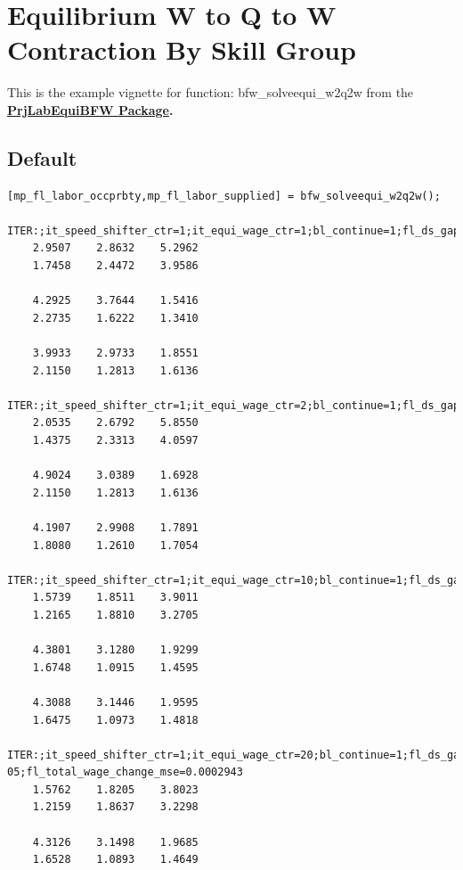 \documentclass[
]{book}
\begin{document}
\hypertarget{equilibrium-w-to-q-to-w-contraction-by-skill-group}{%
\section{Equilibrium W to Q to W Contraction By Skill Group}\label{equilibrium-w-to-q-to-w-contraction-by-skill-group}}

This is the example vignette for function: bfw\_solveequi\_w2q2w from the
\href{https://fanwangecon.github.io/PrjLabEquiBFW/}{\textbf{PrjLabEquiBFW
Package}}\textbf{.}

\hypertarget{default-2}{%
\subsection{Default}\label{default-2}}

\begin{verbatim}
[mp_fl_labor_occprbty,mp_fl_labor_supplied] = bfw_solveequi_w2q2w();

ITER:;it_speed_shifter_ctr=1;it_equi_wage_ctr=1;bl_continue=1;fl_ds_gap_mse=1.0294;fl_total_wage_change_mse=2.4494
    2.9507    2.8632    5.2962
    1.7458    2.4472    3.9586

    4.2925    3.7644    1.5416
    2.2735    1.6222    1.3410

    3.9933    2.9733    1.8551
    2.1150    1.2813    1.6136

ITER:;it_speed_shifter_ctr=1;it_equi_wage_ctr=2;bl_continue=1;fl_ds_gap_mse=0.62115;fl_total_wage_change_mse=1.2697
    2.0535    2.6792    5.8550
    1.4375    2.3313    4.0597

    4.9024    3.0389    1.6928
    2.1150    1.2813    1.6136

    4.1907    2.9908    1.7891
    1.8080    1.2610    1.7054

ITER:;it_speed_shifter_ctr=1;it_equi_wage_ctr=10;bl_continue=1;fl_ds_gap_mse=0.0075186;fl_total_wage_change_mse=0.025808
    1.5739    1.8511    3.9011
    1.2165    1.8810    3.2705

    4.3801    3.1280    1.9299
    1.6748    1.0915    1.4595

    4.3088    3.1446    1.9595
    1.6475    1.0973    1.4818

ITER:;it_speed_shifter_ctr=1;it_equi_wage_ctr=20;bl_continue=1;fl_ds_gap_mse=6.4007e-05;fl_total_wage_change_mse=0.0002943
    1.5762    1.8205    3.8023
    1.2159    1.8637    3.2298

    4.3126    3.1498    1.9685
    1.6528    1.0893    1.4649


\end{verbatim}
\end{document}

